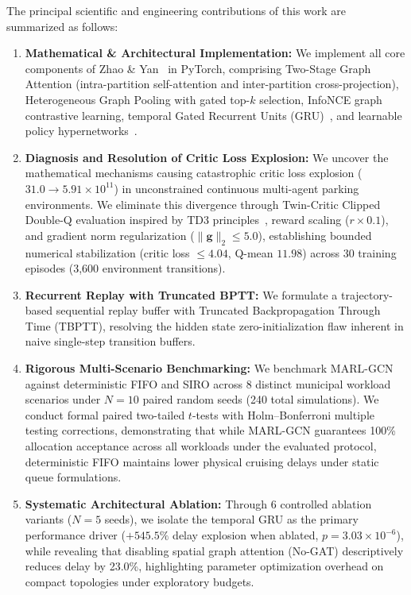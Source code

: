 \documentclass[journal]{IEEEtran}
\begin{document}
The principal scientific and engineering contributions of this work are summarized as follows:
\begin{enumerate}
    \item \textbf{Mathematical \& Architectural Implementation:} We implement all core components of Zhao \& Yan~\cite{zhao2025deep} in PyTorch, comprising Two-Stage Graph Attention (intra-partition self-attention and inter-partition cross-projection), Heterogeneous Graph Pooling with gated top-$k$ selection, InfoNCE graph contrastive learning, temporal Gated Recurrent Units (GRU)~\cite{cho2014learning}, and learnable policy hypernetworks~\cite{ha2017hypernetworks}.
    \item \textbf{Diagnosis and Resolution of Critic Loss Explosion:} We uncover the mathematical mechanisms causing catastrophic critic loss explosion ($31.0 \to 5.91 \times 10^{11}$) in unconstrained continuous multi-agent parking environments. We eliminate this divergence through Twin-Critic Clipped Double-Q evaluation inspired by TD3 principles~\cite{fujimoto2018addressing}, reward scaling ($r \times 0.1$), and gradient norm regularization ($\|\mathbf{g}\|_2 \le 5.0$), establishing bounded numerical stabilization (critic loss $\le 4.04$, Q-mean $11.98$) across 30 training episodes (3,600 environment transitions).
    \item \textbf{Recurrent Replay with Truncated BPTT:} We formulate a trajectory-based sequential replay buffer with Truncated Backpropagation Through Time (TBPTT), resolving the hidden state zero-initialization flaw inherent in naive single-step transition buffers.
    \item \textbf{Rigorous Multi-Scenario Benchmarking:} We benchmark MARL-GCN against deterministic FIFO and SIRO across 8 distinct municipal workload scenarios under $N=10$ paired random seeds (240 total simulations). We conduct formal paired two-tailed $t$-tests with Holm--Bonferroni multiple testing corrections, demonstrating that while MARL-GCN guarantees 100\% allocation acceptance across all workloads under the evaluated protocol, deterministic FIFO maintains lower physical cruising delays under static queue formulations.
    \item \textbf{Systematic Architectural Ablation:} Through 6 controlled ablation variants ($N=5$ seeds), we isolate the temporal GRU as the primary performance driver ($+545.5\%$ delay explosion when ablated, $p = 3.03 \times 10^{-6}$), while revealing that disabling spatial graph attention (No-GAT) descriptively reduces delay by 23.0\%, highlighting parameter optimization overhead on compact topologies under exploratory budgets.

\end{enumerate}
\end{document}
